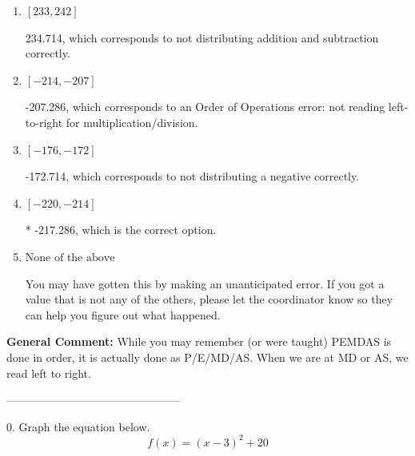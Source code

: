 \documentclass{extbook}[14pt]
\begin{document}
\begin{enumerate}[label=\Alph*.] 
\item $ [233, 242] $ 

  234.714, which corresponds to not distributing addition and subtraction correctly. 
\item $ [-214, -207] $ 

  -207.286, which corresponds to an Order of Operations error: not reading left-to-right for multiplication/division. 
\item $ [-176, -172] $ 

  -172.714, which corresponds to not distributing a negative correctly. 
\item $ [-220, -214] $ 

 * -217.286, which is the correct option. 
\item $ \text{None of the above} $ 

  You may have gotten this by making an unanticipated error. If you got a value that is not any of the others, please let the coordinator know so they can help you figure out what happened. 
\end{enumerate} 
 
\textbf{General Comment:} While you may remember (or were taught) PEMDAS is done in order, it is actually done as P/E/MD/AS. When we are at MD or AS, we read left to right. 

-----------------------------------------------

0. Graph the equation below.
\[ f(x) = (x-3)^2 + 20 \] 
\end{document}
